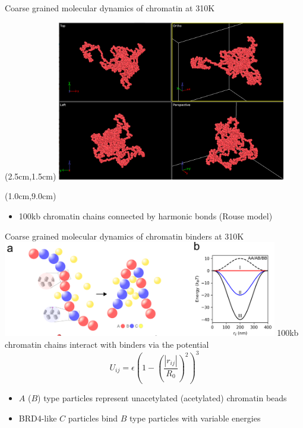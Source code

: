 \documentclass{beamer}					%
\begin{document}
\begin{frame}{Coarse grained molecular dynamics of chromatin at 310K}
\begin{textblock*}{10cm}(2.5cm,1.5cm)
\includegraphics[width=10cm]{../../brd4/brd4/media/Rouse}
\end{textblock*}
\begin{textblock*}{13cm}(1.0cm,9.0cm)
\begin{itemize}
\item 100kb chromatin chains connected by harmonic bonds (Rouse model)
\end{itemize}
\end{textblock*}
\end{frame}

\begin{frame}{Coarse grained molecular dynamics of chromatin binders at 310K}
\includegraphics[width=12cm]{../../brd4/brd4/media/MD-1}
100kb chromatin chains interact with binders via the potential 
\begin{equation*}
U_{ij} = \epsilon \left(1-\left(\frac{|r_{ij}|}{R_{0}}\right)^{2}\right)^{3}
\end{equation*}
\begin{itemize}
\item $A$ ($B$) type particles represent unacetylated (acetylated) chromatin beads
\item BRD4-like $C$ particles bind $B$ type particles with variable energies
\end{itemize}
\end{frame}
\end{document}
